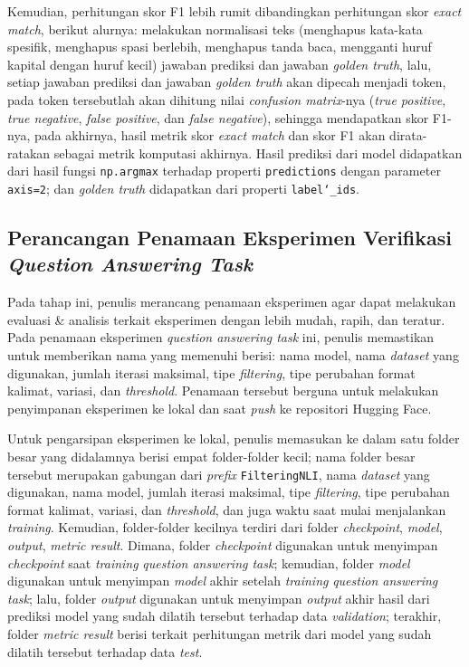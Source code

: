 Kemudian, perhitungan skor F1 lebih rumit dibandingkan perhitungan skor \emph{exact match}, berikut alurnya: melakukan normalisasi teks (menghapus kata-kata spesifik, menghapus spasi berlebih, menghapus tanda baca, mengganti huruf kapital dengan huruf kecil) jawaban prediksi dan jawaban \emph{golden truth}, lalu, setiap jawaban prediksi dan jawaban \emph{golden truth} akan dipecah menjadi token, pada token tersebutlah akan dihitung nilai \emph{confusion matrix}-nya (\emph{true positive}, \emph{true negative}, \emph{false positive}, dan \emph{false negative}), sehingga mendapatkan skor F1-nya, pada akhirnya, hasil metrik skor \emph{exact match} dan skor F1 akan dirata-ratakan sebagai metrik komputasi akhirnya. Hasil prediksi dari model didapatkan dari hasil fungsi \texttt{np.argmax} terhadap properti \texttt{predictions} dengan parameter \texttt{axis=2}; dan \emph{golden truth} didapatkan dari properti \texttt{label\char`_ids}. 

\subsection{Perancangan Penamaan Eksperimen Verifikasi \emph{Question Answering Task}}
Pada tahap ini, penulis merancang penamaan eksperimen agar dapat melakukan evaluasi \& analisis terkait eksperimen dengan lebih mudah, rapih, dan teratur. Pada penamaan eksperimen \emph{question answering task} ini, penulis memastikan untuk memberikan nama yang memenuhi berisi: nama model, nama \emph{dataset} yang digunakan, jumlah iterasi maksimal, tipe \emph{filtering}, tipe perubahan format kalimat, variasi, dan \emph{threshold}. Penamaan tersebut berguna untuk melakukan penyimpanan eksperimen ke lokal dan saat \emph{push} ke repositori Hugging Face. 

Untuk pengarsipan eksperimen ke lokal, penulis memasukan ke dalam satu folder besar yang didalamnya berisi empat folder-folder kecil; nama folder besar tersebut merupakan gabungan dari \emph{prefix} \texttt{FilteringNLI}, nama \emph{dataset} yang digunakan, nama model, jumlah iterasi maksimal, tipe \emph{filtering}, tipe perubahan format kalimat, variasi, dan \emph{threshold}, dan juga waktu saat mulai menjalankan \emph{training}. Kemudian, folder-folder kecilnya terdiri dari folder \emph{checkpoint}, \emph{model}, \emph{output}, \emph{metric result}. Dimana, folder \emph{checkpoint} digunakan untuk menyimpan \emph{checkpoint} saat \emph{training} \emph{question answering task}; kemudian, folder \emph{model} digunakan untuk menyimpan \emph{model} akhir setelah \emph{training} \emph{question answering task}; lalu, folder \emph{output} digunakan untuk menyimpan \emph{output} akhir hasil dari prediksi model yang sudah dilatih tersebut terhadap data \emph{validation}; terakhir, folder \emph{metric result} berisi terkait perhitungan metrik dari model yang sudah dilatih tersebut terhadap data \emph{test}. 

